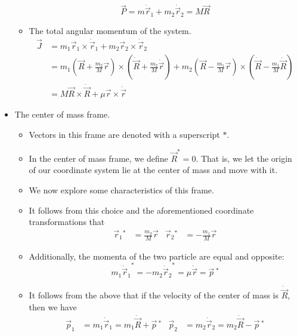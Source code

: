 \documentclass[../notes.tex]{subfiles}
\begin{document}
\begin{itemize}
\begin{itemize}
        \begin{equation*}
            \vec{P} = m\dot{\vec{r}}_1+m_2\dot{\vec{r}}_2 = M\vec{R}
        \end{equation*}
        \item The total angular momentum of the system.
        \begin{align*}
            \vec{J} &= m_1\vec{r}_1\times\dot{\vec{r}}_1+m_2\vec{r}_2\times\dot{\vec{r}}_2\\
            &= m_1\left( \vec{R}+\frac{m_2}{M}\vec{r} \right)\times\left( \dot{\vec{R}}+\frac{m_2}{M}\dot{\vec{r}} \right)+m_2\left( \vec{R}-\frac{m_1}{M}\vec{r} \right)\times\left( \dot{\vec{R}}-\frac{m_1}{M}\dot{\vec{R}} \right)\\
            &= M\vec{R}\times\dot{\vec{R}}+\mu\vec{r}\times\dot{\vec{r}}
        \end{align*}
    \end{itemize}
    \item The center of mass frame.
    \begin{itemize}
        \item Vectors in this frame are denoted with a superscript $*$.
        \item In the center of mass frame, we define $\vec{R}^*=0$. That is, we let the origin of our coordinate system lie at the center of mass and move with it.
        \item We now explore some characteristics of this frame.
        \item It follows from this choice and the aforementioned coordinate transformations that
        \begin{align*}
            \vec{r}_1{}^* &= \frac{m_2}{M}\vec{r}&
            \vec{r}_2{}^* &= -\frac{m_1}{M}\vec{r}
        \end{align*}
        \item Additionally, the momenta of the two particle are equal and opposite:
        \begin{equation*}
            m_1{\dot{\vec{r}}_1}^* = -m_2{\dot{\vec{r}}_2}^* = \mu\dot{\vec{r}} = \vec{p}{\,}^*
        \end{equation*}
        \item It follows from the above that if the velocity of the center of mass is $\dot{\vec{R}}$, then we have
        \begin{align*}
            \vec{p}_1 &= m_1\dot{\vec{r}}_1 = m_1\dot{\vec{R}}+\vec{p}{\,}^*&
            \vec{p}_2 &= m_2\dot{\vec{r}}_2 = m_2\dot{\vec{R}}-\vec{p}{\,}^*

\end{align*}
\end{itemize}
\end{itemize}
\end{document}
